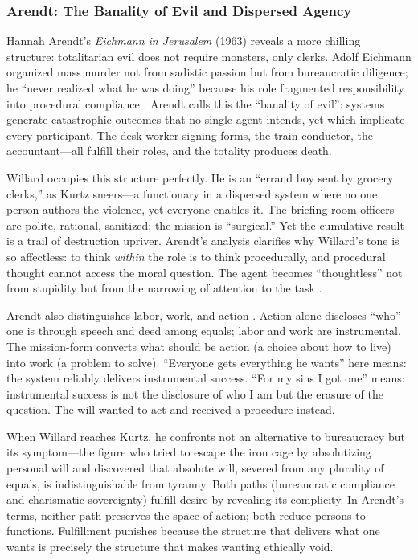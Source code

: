\subsubsection*{Arendt: The Banality of Evil and Dispersed Agency}
Hannah Arendt's \textit{Eichmann in Jerusalem} (1963) reveals a more chilling structure: 
totalitarian evil does not require monsters, only clerks. Adolf Eichmann organized mass murder 
not from sadistic passion but from bureaucratic diligence; he ``never realized what he was 
doing'' because his role fragmented responsibility into procedural compliance 
\parencite{ArendtEichmann1963}. Arendt calls this the ``banality of evil'': systems generate 
catastrophic outcomes that no single agent intends, yet which implicate every participant. The 
desk worker signing forms, the train conductor, the accountant---all fulfill their roles, and 
the totality produces death.

Willard occupies this structure perfectly. He is an ``errand boy sent by grocery clerks,'' as 
Kurtz sneers---a functionary in a dispersed system where no one person authors the violence, 
yet everyone enables it. The briefing room officers are polite, rational, sanitized; the 
mission is ``surgical.'' Yet the cumulative result is a trail of destruction upriver. Arendt's 
analysis clarifies why Willard's tone is so affectless: to think \emph{within} the role is to 
think procedurally, and procedural thought cannot access the moral question. The agent becomes 
``thoughtless'' not from stupidity but from the narrowing of attention to the task 
\parencite{ArendtEichmann1963}.

Arendt also distinguishes labor, work, and action \parencite{ArendtHC1958}. Action alone 
discloses ``who'' one is through speech and deed among equals; labor and work are instrumental. 
The mission-form converts what should be action (a choice about how to live) into work (a 
problem to solve). ``Everyone gets everything he wants'' here means: the system reliably 
delivers instrumental success. ``For my sins I got one'' means: instrumental success is not the 
disclosure of who I am but the erasure of the question. The will wanted to act and received a 
procedure instead.

When Willard reaches Kurtz, he confronts not an alternative to bureaucracy but its 
symptom---the figure who tried to escape the iron cage by absolutizing personal will and 
discovered that absolute will, severed from any plurality of equals, is indistinguishable from 
tyranny. Both paths (bureaucratic compliance and charismatic sovereignty) fulfill desire by 
revealing its complicity. In Arendt's terms, neither path preserves the space of action; both 
reduce persons to functions. Fulfillment punishes because the structure that delivers what one 
wants is precisely the structure that makes wanting ethically void.

